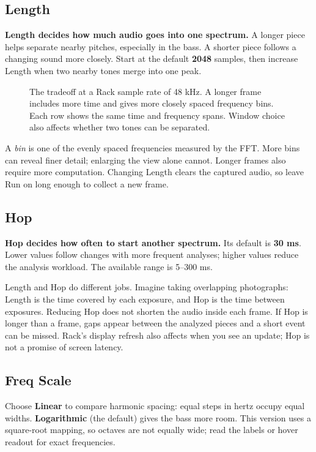 \clearpage
\subsection{Length}

\textbf{Length decides how much audio goes into one spectrum.} A longer
piece helps separate nearby pitches, especially in the bass. A shorter piece
follows a changing sound more closely. Start at the default \textbf{2048}
samples, then increase Length when two nearby tones merge into one peak.

\begin{figure}[!htp]
\centering

\caption{The tradeoff at a Rack sample rate of 48 kHz. A longer frame includes
more time and gives more closely spaced frequency bins. Each row shows the
same time and frequency spans. Window choice also affects whether two tones
can be separated.}
\end{figure}

A \textit{bin} is one of the evenly spaced frequencies measured by the FFT.
More bins can reveal finer detail; enlarging the view alone cannot. Longer
frames also require more computation. Changing Length clears the captured
audio, so leave Run on long enough to collect a new frame.

\subsection{Hop}

\textbf{Hop decides how often to start another spectrum.} Its default is
\textbf{30 ms}. Lower values follow changes with more frequent analyses;
higher values reduce the analysis workload. The available range is 5--300 ms.

Length and Hop do different jobs. Imagine taking overlapping photographs:
Length is the time covered by each exposure, and Hop is the time between
exposures. Reducing Hop does not shorten the audio inside each frame.
If Hop is longer than a frame, gaps appear between the analyzed pieces and
a short event can be missed. Rack's display refresh also affects when you
see an update; Hop is not a promise of screen latency.

\clearpage
\subsection{Freq Scale}

Choose \textbf{Linear} to compare harmonic spacing: equal steps in hertz
occupy equal widths. \textbf{Logarithmic} (the default) gives the bass more
room. This version uses a square-root mapping, so octaves are not equally
wide; read the labels or hover readout for exact frequencies.

